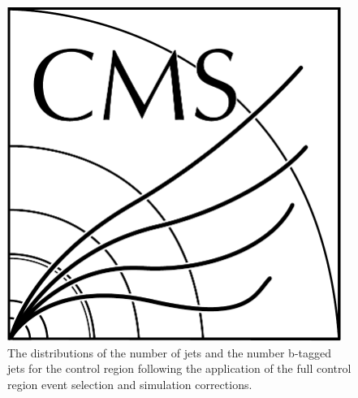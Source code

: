 
\begin{figure}[htb]
\centering
\includegraphics[width=0.97\textwidth]{CMS-bw-logo.pdf}
\caption{
The distributions of the number of jets and the number b-tagged jets for the \ttbar control region following the application of the full control region event selection and simulation corrections.
}
\label{fig:ttbarCR_nJets}
\end{figure}

